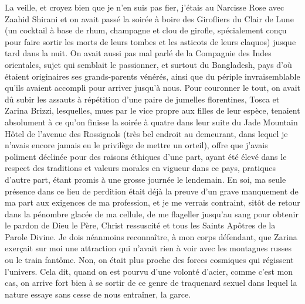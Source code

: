 La veille, et croyez bien que je n’en suis pas fier, j’étais au Narcisse Rose avec Zaahid Shirani et on avait passé la soirée à boire des Girofliers du Clair de Lune (un cocktail à base de rhum, champagne et clou de girofle, spécialement conçu pour faire sortir les morts de leurs tombes et les asticots de leurs claquos) jusque tard dans la nuit. On avait aussi pas mal parlé de la Compagnie des Indes orientales, sujet qui semblait le passionner, et surtout du Bangladesh, pays d’où étaient originaires ses grands-parents vénérés, ainsi que du périple invraisemblable qu’ils avaient accompli pour arriver jusqu’à nous. Pour couronner le tout, on avait dû subir les assauts à répétition d’une paire de jumelles florentines, Tosca et Zarina Brizzi, lesquelles, mues par le vice propre aux filles de leur espèce, tenaient absolument à ce qu’on finisse la soirée à quatre dans leur suite du Jade Mountain Hôtel de l’avenue des Rossignols (très bel endroit au demeurant, dans lequel je n’avais encore jamais eu le privilège de mettre un orteil), offre que j’avais poliment déclinée pour des raisons éthiques d’une part, ayant été élevé dans le respect des traditions et valeurs morales en vigueur dans ce pays, pratiques d’autre part, étant promis à une grosse journée le lendemain. En soi, ma seule présence dans ce lieu de perdition était déjà la preuve d’un grave manquement de ma part aux exigences de ma profession, et je me verrais contraint, sitôt de retour dans la pénombre glacée de ma cellule, de me flageller jusqu’au sang pour obtenir le pardon de Dieu le Père, Christ ressuscité et tous les Saints Apôtres de la Parole Divine. Je dois néanmoins reconnaître, à mon corps défendant, que Zarina exerçait sur moi une attraction qui n’avait rien à voir avec les montagnes russes ou le train fantôme. Non, on était plus proche des forces cosmiques qui régissent l’univers. Cela dit, quand on est pourvu d’une volonté d’acier, comme c’est mon cas, on arrive fort bien à se sortir de ce genre de traquenard sexuel dans lequel la nature essaye sans cesse de nous entraîner, la garce.

